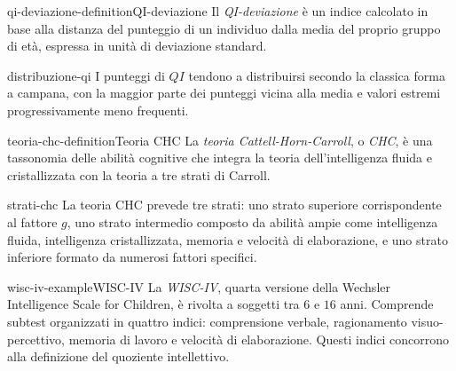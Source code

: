 \documentclass[preview]{standalone}
\begin{document}
\begin{snippetdefinition}{qi-deviazione-definition}{QI-deviazione}
    Il \emph{QI-deviazione} è un indice calcolato in base alla distanza del
    punteggio di un individuo dalla media del proprio gruppo di età, espressa in
    unità di deviazione standard.
\end{snippetdefinition}

\begin{snippet}{distribuzione-qi}
    I punteggi di \(QI\) tendono a distribuirsi secondo la classica forma a
    campana, con la maggior parte dei punteggi vicina alla media e valori estremi
    progressivamente meno frequenti.
\end{snippet}


\begin{snippetdefinition}{teoria-chc-definition}{Teoria CHC}
    La \emph{teoria Cattell-Horn-Carroll}, o \emph{CHC}, è una tassonomia delle
    abilità cognitive che integra la teoria dell'intelligenza fluida e
    cristallizzata con la teoria a tre strati di Carroll.
\end{snippetdefinition}

\begin{snippet}{strati-chc}
    La teoria CHC prevede tre strati: uno strato superiore corrispondente al
    fattore \(g\), uno strato intermedio composto da abilità ampie come
    intelligenza fluida, intelligenza cristallizzata, memoria e velocità di
    elaborazione, e uno strato inferiore formato da numerosi fattori specifici.
\end{snippet}


\begin{snippetexample}{wisc-iv-example}{WISC-IV}
    La \emph{WISC-IV}, quarta versione della Wechsler Intelligence Scale for
    Children, è rivolta a soggetti tra \(6\) e \(16\) anni. Comprende subtest
    organizzati in quattro indici: comprensione verbale, ragionamento
    visuo-percettivo, memoria di lavoro e velocità di elaborazione. Questi
    indici concorrono alla definizione del quoziente intellettivo.
\end{snippetexample}

\end{document}
